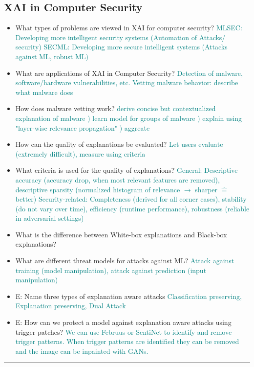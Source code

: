 \documentclass{report}
\newcommand{\asw}[2][teal]{}
\renewcommand{\asw}[2][teal]{\textcolor{#1}{#2}}
\begin{document}
		\subsection{XAI in Computer Security}
		
		\begin{itemize}
		\item What types of problems are viewed in XAI for computer security?
		\asw{\newline MLSEC: Developing more intelligent security systems (Automation of Attacks/ security)
			\newline SECML: Developing more secure intelligent systems (Attacks against ML, robust ML)}
		\item What are applications of XAI in Computer Security?
		\asw{\newline Detection of malware, software/hardware vulnerabilities, etc.
			\newline Vetting malware behavior: describe what malware does}
		\item How does malware vetting work?
		\asw{\newline derive concise but contextualized explanation of malware
			\newline 1) learn model for groups of malware
			\newline 2) explain using "layer-wise relevance propagation"
			\newline 3) aggreate}
		\item How can the quality of explanations be evaluated?
		\asw{\newline Let users evaluate (extremely difficult), measure using criteria}
		\item What criteria is used for the quality of explanations?
		\asw{\newline General: Descriptive accuracy (accuracy drop, when most relevant features are removed), descriptive sparsity (normalized histogram of relevance $\rightarrow$ sharper $\widehat{=}$ better)
			\newline Security-related: Completeness (derived for all corner cases), stability (do not vary over time), efficiency (runtime performance), robustness (reliable in adversarial settings)}
		\item What is the difference between White-box explanations and Black-box explanations?
		\asw{\newline }
		\item What are different threat models for attacks against ML?
		\asw{\newline Attack against training (model manipulation), attack against prediction (input manipulation)}
		\item E: Name three types of explanation aware attacks
		\asw{\newline Classification preserving, Explanation preserving, Dual Attack}
		\item E: How can we protect a model against explanation aware attacks using trigger patches?
		\asw{\newline We can use Februus or SentiNet to identify and remove trigger patterns. When trigger patterns are identified they can be removed and the image can be inpainted with GANs.}
		\end{itemize}
		\hrule 
	
\end{document}
